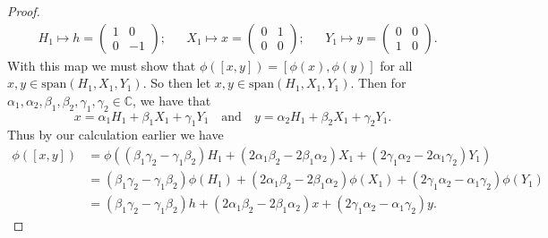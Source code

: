 \documentclass[12pt]{article}
\theoremstyle{definition}
\begin{document}
\begin{enumerate}
\begin{enumerate}[label=(\alph*)]
\begin{proof}
                        \begin{align*}
                            &H_1\mapsto h=\begin{pmatrix}1&0\\0&-1\end{pmatrix};&
                            &X_1\mapsto x=\begin{pmatrix}0&1\\0&0\end{pmatrix} ;&
                            &Y_1\mapsto y=\begin{pmatrix}0&0\\1&0\end{pmatrix} .
                        \end{align*}
                        With this map we must show that $\phi([x, y])=[\phi(x),
                        \phi(y)]$ for all $x, y\in\text{span}(H_1, X_1, Y_1)$.
                        So then let $x, y\in\text{span}(H_1, X_1, Y_1)$. Then
                        for $\alpha_1, \alpha_2, \beta_1, \beta_2, \gamma_1,
                        \gamma_2\in\mathbb{C}$, we have that 
                        \begin{equation*}
                            x = \alpha_1H_1+\beta_1X_1+\gamma_1Y_1\quad\text{and}\quad
                            y=\alpha_2H_1+\beta_2X_1+\gamma_2Y_1.
                        \end{equation*}
                        Thus by our calculation earlier we have
                        \begin{equation*}
                            \begin{split}
                                \phi([x, y]) &=
                                \phi((\beta_1\gamma_2-\gamma_1\beta_2)H_1
                                +(2\alpha_1\beta_2-2\beta_1\alpha_2)X_1
                                +(2\gamma_1\alpha_2-2\alpha_1\gamma_2)Y_1) \\
                                &=(\beta_1\gamma_2-\gamma_1\beta_2)\phi(H_1)
                                +(2\alpha_1\beta_2-2\beta_1\alpha_2)\phi(X_1)
                                +(2\gamma_1\alpha_2-\alpha_1\gamma_2)\phi(Y_1)
                                \\
                                &=(\beta_1\gamma_2-\gamma_1\beta_2)h
                                +(2\alpha_1\beta_2-2\beta_1\alpha_2)x
                                +(2\gamma_1\alpha_2-\alpha_1\gamma_2)y.
                            \end{split}
                        \end{equation*}

\end{proof}
\end{enumerate}
\end{enumerate}
\end{document}
